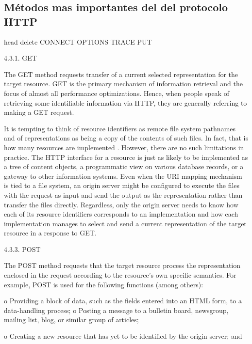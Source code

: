     
 


\subsection{Métodos mas importantes del del protocolo HTTP}

head 
delete      
CONNECT
OPTIONS
TRACE
PUT

4.3.1.  GET

   The GET method requests transfer of a current selected representation
   for the target resource.  GET is the primary mechanism of information
   retrieval and the focus of almost all performance optimizations.
   Hence, when people speak of retrieving some identifiable information
   via HTTP, they are generally referring to making a GET request.

   It is tempting to think of resource identifiers as remote file system
   pathnames and of representations as being a copy of the contents of
   such files.  In fact, that is how many resources are implemented 
   .  However, there are
   no such limitations in practice.  The HTTP interface for a resource
   is just as likely to be implemented as a tree of content objects, a
   programmatic view on various database records, or a gateway to other
   information systems.  Even when the URI mapping mechanism is tied to
   a file system, an origin server might be configured to execute the
   files with the request as input and send the output as the
   representation rather than transfer the files directly.  Regardless,
   only the origin server needs to know how each of its resource
   identifiers corresponds to an implementation and how each
   implementation manages to select and send a current representation of
   the target resource in a response to GET.


4.3.3.  POST

   The POST method requests that the target resource process the
   representation enclosed in the request according to the resource's
   own specific semantics.  For example, POST is used for the following
   functions (among others):

   o  Providing a block of data, such as the fields entered into an HTML
      form, to a data-handling process;
      o  Posting a message to a bulletin board, newsgroup, mailing list,
      blog, or similar group of articles;

   o  Creating a new resource that has yet to be identified by the
      origin server; and

